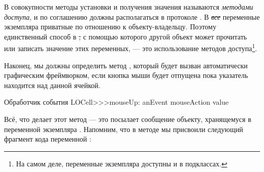 \documentclass[a4paper,10pt,twoside]{book}
\begin{document}
{%
В совокупности методы установки и получения значения называются \emph{методами доступа}, и по соглашению должны располагаться в протоколе .
В \st \emph{все} переменные экземпляра приватные по отношению к объекту-владельцу. Поэтому единственный способ в \st, с помощью которого другой объект может прочитать или записать значение этих переменных, --- это использование методов доступа\footnote{На самом деле, переменные экземпляра доступны и в подклассах.}.


Наконец, мы должны определить метод , который будет вызван автоматически графическим фреймворком, если кнопка мыши будет отпущена пока указатель находится над данной ячейкой.

\begin{method}[sbecellmouseup]{Обработчик события}
LOCell>>>mouseUp: anEvent
   mouseAction value
\end{method}


Всё, что делает этот метод --- это посылает сообщение  объекту, хранящемуся в переменной экземпляра . 
Напомним, что в методе  мы присвоили следующий фрагмент кода переменной :

}
\end{document}
